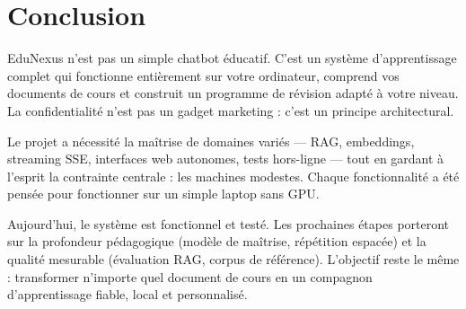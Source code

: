 \documentclass[11pt,a4paper]{article}
\begin{document}
\section{Conclusion}

EduNexus n'est pas un simple chatbot éducatif. C'est un système d'apprentissage complet qui fonctionne entièrement sur votre ordinateur, comprend vos documents de cours et construit un programme de révision adapté à votre niveau. La confidentialité n'est pas un gadget marketing : c'est un principe architectural.

Le projet a nécessité la maîtrise de domaines variés --- RAG, embeddings, streaming SSE, interfaces web autonomes, tests hors-ligne --- tout en gardant à l'esprit la contrainte centrale : les machines modestes. Chaque fonctionnalité a été pensée pour fonctionner sur un simple laptop sans GPU.

Aujourd'hui, le système est fonctionnel et testé. Les prochaines étapes porteront sur la profondeur pédagogique (modèle de maîtrise, répétition espacée) et la qualité mesurable (évaluation RAG, corpus de référence). L'objectif reste le même : transformer n'importe quel document de cours en un compagnon d'apprentissage fiable, local et personnalisé.
\end{document}
